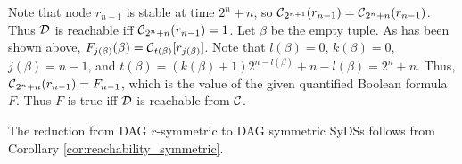 Note that node $r_{n-1}$ is stable at  time $2^n+n$,
so $ \mbox{$\mathcal{C}$}_{2^{n+1}}(r_{n-1}) = \mbox{$\mathcal{C}$}_{2^n+n}(r_{n-1})$.
Thus  $\mbox{$\mathcal{D}$}$ is reachable iff $\mbox{$\mathcal{C}$}_{2^n+n}(r_{n-1}) = 1$.
Let $\beta$ be the empty tuple.
As has been shown above,
$F_{j(\beta)}(\beta) =\mbox{$\mathcal{C}$}_{t(\beta)}[r_{j(\beta)}]$.
Note that $l(\beta) = 0$, $k(\beta) = 0$, $j(\beta) = n-1$,
and $t(\beta) = (k(\beta)+1) 2^{n-l(\beta)} +n -l(\beta) = 2^n+n$. 
Thus, $\mbox{$\mathcal{C}$}_{2^n+n}(r_{n-1}) = F_{n-1}$, which is the value of the given quantified Boolean formula $F$.
Thus $F$ is true iff $\mbox{$\mathcal{D}$}$ is reachable from $\mbox{$\mathcal{C}$}$.

\bigskip
The reduction from DAG $r$-symmetric to DAG symmetric SyDSs follows from Corollary \ref{cor:reachability_symmetric}.
\QED
